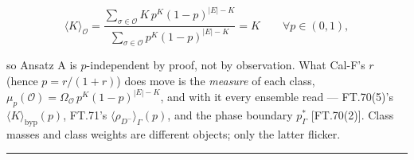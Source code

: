 \begin{definition}
\[
\langle K\rangle_{\mathcal O}=\frac{\sum_{\sigma\in\mathcal O}K\,p^{K}(1-p)^{|E|-K}}{\sum_{\sigma\in\mathcal O}p^{K}(1-p)^{|E|-K}}=K\qquad\forall p\in(0,1),
\]

so Ansatz A is $p$-independent by proof, not by observation. What Cal-F's $r$ (hence $p=r/(1+r)$) does move is the \textit{measure} of each class, $\mu_p(\mathcal O)=\Omega_{\mathcal O}\,p^{K}(1-p)^{|E|-K}$, and with it every ensemble read — FT.70(5)'s $\langle K\rangle_{\mathrm{byp}}(p)$, FT.71's $\langle\rho_{D^-}\rangle_\Gamma(p)$, and the phase boundary $p^*_\Gamma$ [FT.70(2)]. Class masses and class weights are different objects; only the latter flicker.

\vspace{2pt}\noindent\rule{\textwidth}{0.4pt}\vspace{2pt}

\end{definition}

